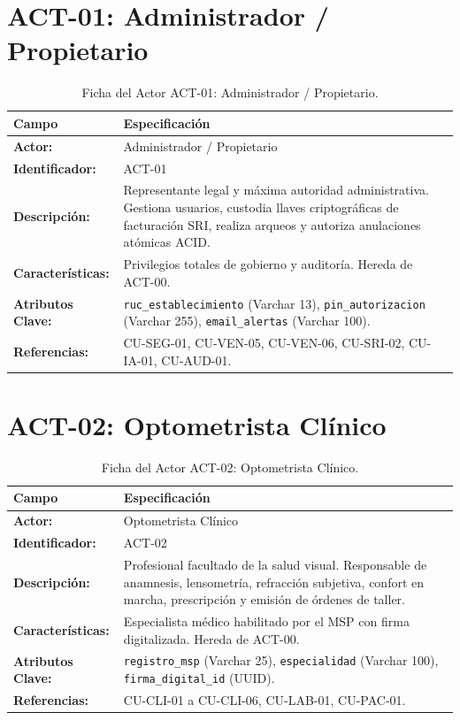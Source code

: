 \documentclass[12pt,a4paper]{report}
\begin{document}
\section{ACT-01: Administrador / Propietario}
\begin{table}[H]
\centering
\small
\begin{tabularx}{\textwidth}{|L{3.5cm}|X|}
\hline
{}\color{white}\textbf{Campo} & \color{white}\textbf{Especificación} \\
\hline
\textbf{Actor:} & Administrador / Propietario \\
\hline
\textbf{Identificador:} & ACT-01 \\
\hline
\textbf{Descripción:} & Representante legal y máxima autoridad administrativa. Gestiona usuarios, custodia llaves criptográficas de facturación SRI, realiza arqueos y autoriza anulaciones atómicas ACID. \\
\hline
\textbf{Características:} & Privilegios totales de gobierno y auditoría. Hereda de ACT-00. \\
\hline
\textbf{Atributos Clave:} & \texttt{ruc\_establecimiento} (Varchar 13), \texttt{pin\_autorizacion} (Varchar 255), \texttt{email\_alertas} (Varchar 100). \\
\hline
\textbf{Referencias:} & CU-SEG-01, CU-VEN-05, CU-VEN-06, CU-SRI-02, CU-IA-01, CU-AUD-01. \\
\hline
\end{tabularx}
\caption{Ficha del Actor ACT-01: Administrador / Propietario.}
\end{table}

\section{ACT-02: Optometrista Clínico}
\begin{table}[H]
\centering
\small
\begin{tabularx}{\textwidth}{|L{3.5cm}|X|}
\hline
{}\color{white}\textbf{Campo} & \color{white}\textbf{Especificación} \\
\hline
\textbf{Actor:} & Optometrista Clínico \\
\hline
\textbf{Identificador:} & ACT-02 \\
\hline
\textbf{Descripción:} & Profesional facultado de la salud visual. Responsable de anamnesis, lensometría, refracción subjetiva, confort en marcha, prescripción y emisión de órdenes de taller. \\
\hline
\textbf{Características:} & Especialista médico habilitado por el MSP con firma digitalizada. Hereda de ACT-00. \\
\hline
\textbf{Atributos Clave:} & \texttt{registro\_msp} (Varchar 25), \texttt{especialidad} (Varchar 100), \texttt{firma\_digital\_id} (UUID). \\
\hline
\textbf{Referencias:} & CU-CLI-01 a CU-CLI-06, CU-LAB-01, CU-PAC-01. \\
\hline
\end{tabularx}
\caption{Ficha del Actor ACT-02: Optometrista Clínico.}
\end{table}
\end{document}
